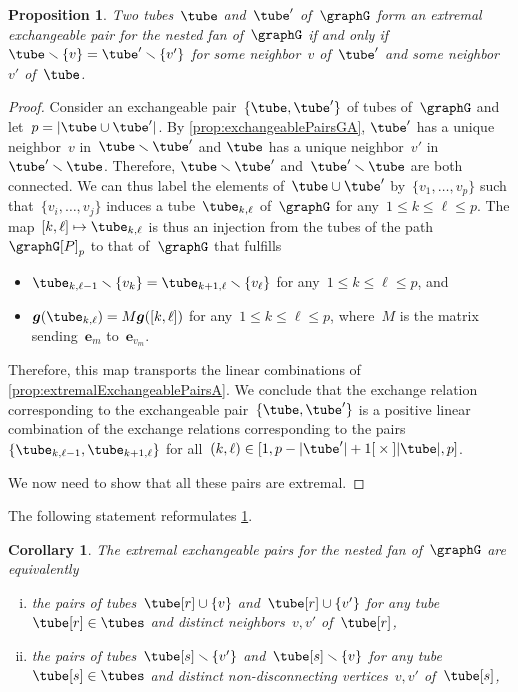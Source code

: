 \documentclass{amsart}
\newtheorem{corollary}[theorem]{Corollary}
\newtheorem{proposition}[theorem]{Proposition}
\theoremstyle{definition}
\renewcommand{\b}[1]{{\boldsymbol{#1}}} %
\newcommand{\ssm}{\smallsetminus} %
\newcommand{\symdif}{\,\triangle\,} %
\newcommand{\vincent}[1]{\todo[color=blue!30]{#1 \\ \hfill --- V.}}
\newcommand{\gvector}[1]{\b{g}(#1)} %
\begin{document}
\begin{proposition}
\label{prop:extremalExchangeablePairsGA}
Two tubes~$\tube$ and~$\tube'$ of~$\graphG$ form an extremal exchangeable pair for the nested fan of~$\graphG$ if and only if~${\tube \ssm \{v\} = \tube' \ssm \{v'\}}$ for some neighbor~$v$ of~$\tube'$ and some neighbor~$v'$ of~$\tube$.
\end{proposition}

\begin{proof}
Consider an exchangeable pair~$\{\tube, \tube'\}$ of tubes of~$\graphG$ and let~$p = |\tube \cup \tube'|$.
By \cref{prop:exchangeablePairsGA}, $\tube'$ has a unique neighbor~$v$ in~$\tube \ssm \tube'$ and $\tube$ has a unique neighbor~$v'$ in~$\tube' \ssm \tube$.
Therefore, $\tube \ssm \tube'$ and~$\tube' \ssm \tube$ are both connected.
We can thus label the elements of~$\tube \cup \tube'$ by~$\{v_1, \dots, v_p\}$ such that~$\{v_i, \dots, v_j\}$ induces a tube~$\tube_{k,\ell}$ of~$\graphG$ for any~$1 \le k \le \ell \le p$. 
The map~$[k,\ell] \mapsto \tube_{k,\ell}$ is thus an injection from the tubes of the path~$\graphG[P]_p$ to that of~$\graphG$ that fulfills
\begin{itemize}
\item $\tube_{k,\ell-1} \ssm \{v_k\} = \tube_{k+1,\ell} \ssm \{v_\ell\}$ for any~$1 \le k \le \ell \le p$, and
\item $\gvector{\tube_{k,\ell}} = M\gvector{[k,\ell]}$ for any~$1 \le k \le \ell \le p$, where~$M$ is the matrix sending~$\b{e}_m$ to~$\b{e}_{v_m}$.
\end{itemize}
Therefore, this map transports the linear combinations of \cref{prop:extremalExchangeablePairsA}.
We conclude that the exchange relation corresponding to the exchangeable pair~$\{\tube, \tube'\}$ is a positive linear combination of the exchange relations corresponding to the pairs~$\{\tube_{k,\ell-1}, \tube_{k+1,\ell}\}$ for all~${(k,\ell) \in {[1, p-|\tube'|+1[} \times {]|\tube|, p]}}$.

We now need to show that all these pairs are extremal.
\vincent{TODO}
\end{proof}

The following statement reformulates \cref{prop:extremalExchangeablePairsGA}.

\begin{corollary}
\label{coro:extremalExchangeablePairsGA}
The extremal exchangeable pairs for the nested fan of~$\graphG$ are equivalently
\begin{enumerate}[(i)]
\item the pairs of tubes~$\tube[r] \cup \{v\}$ and~$\tube[r] \cup \{v'\}$ for any tube~$\tube[r] \in \tubes$ and distinct neighbors~$v,v'$ of~$\tube[r]$,
\item the pairs of tubes~$\tube[s] \ssm \{v'\}$ and~$\tube[s] \ssm \{v\}$ for any tube~$\tube[s] \in \tubes$ and distinct non-disconnecting vertices~$v,v'$ of~$\tube[s]$,
\end{enumerate}
\end{corollary}
\end{document}
